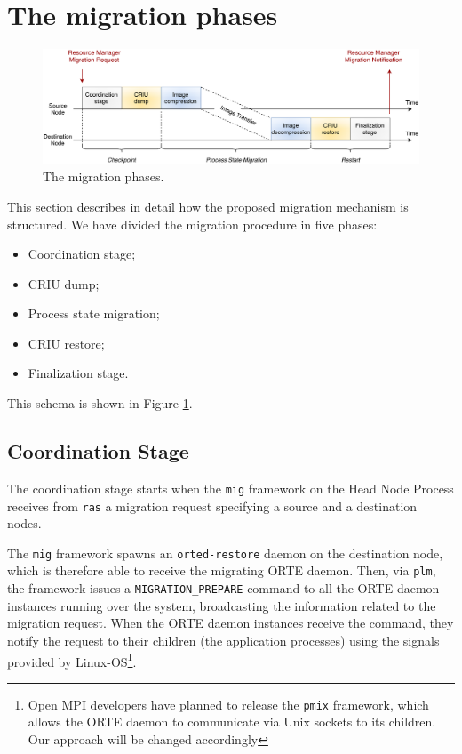 \section{The migration phases}
\label{sec:cap4-migphases}
\begin{figure}[t]
		\centerline 
{\includegraphics[scale=0.43]{img/cap4-phases.eps}}
		\caption[The migration phases]{The migration phases.}
		\label{fig:cap4-migphases}
\end{figure}

This section describes in detail how the proposed migration mechanism
is structured. We have divided the migration procedure in five phases:
\begin{itemize}
\item Coordination stage;
\item CRIU dump;
\item Process state migration;
\item CRIU restore; 
\item Finalization stage.
\end{itemize}
This schema is shown in Figure \ref{fig:cap4-migphases}.

\subsection{Coordination Stage}

The coordination stage starts when the \texttt{mig} framework on the Head Node Process
receives from \texttt{ras} a migration request specifying a source and a destination nodes.

The \texttt{mig} framework spawns an \texttt{orted-restore} daemon on the
destination node, which is therefore able to receive the migrating ORTE
daemon. Then, via \texttt{plm}, the framework issues a \texttt{MIGRATION\_PREPARE}
command to all the ORTE daemon instances running over the system, broadcasting
the information related to the migration request.
When the ORTE daemon instances receive the command, they notify the request to
their children (the application processes) using the signals provided by
Linux-OS\footnote{Open MPI developers have planned to release the
\texttt{pmix} framework, which allows the ORTE daemon to communicate via Unix
sockets to its children. Our approach will be changed accordingly}.

